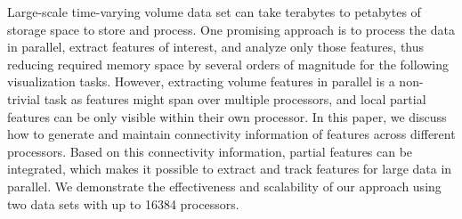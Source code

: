 Large-scale time-varying volume data set can take terabytes to petabytes of storage space to store and process. One promising approach is to process the data in parallel, extract features of interest, and analyze only those features, thus reducing required memory space by several orders of magnitude for the following visualization tasks. However, extracting volume features in parallel is a non-trivial task as features might span over multiple processors, and local partial features can be only visible within their own processor. In this paper, we discuss how to generate and maintain connectivity information of features across different processors. Based on this connectivity information, partial features can be integrated, which makes it possible to extract and track features for large data in parallel. We demonstrate the effectiveness and scalability of our approach using two data sets with up to 16384 processors.